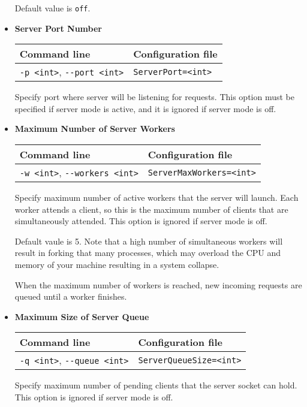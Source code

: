 \documentclass[a4paper]{book}
\begin{document}
\begin{itemize}
 Default value is \verb#off#.

\item {\bf Server Port Number}

\begin{tabular}{|l|l|}
Command line       & Configuration file   \\ \hline
\verb#-p <int>#, \verb#--port <int>#   & \verb#ServerPort=<int>#  \\ \hline
\end{tabular}

  Specify port where server will be listening for requests.  This
  option must be specified if server mode is active, and it is ignored
  if server mode is off.

\item {\bf Maximum Number of Server Workers}

\begin{tabular}{|l|l|}
Command line       & Configuration file   \\ \hline
\verb#-w <int>#, \verb#--workers <int>#   & \verb#ServerMaxWorkers=<int>#  \\ \hline
\end{tabular}

  Specify maximum number of active workers that the server will launch.
  Each worker attends a client, so this is the maximum number of
  clients that are simultaneously attended.
  This option is ignored if server mode is off.

  Default vaule is 5. Note that a high number of simultaneous workers will 
  result in forking that many processes, which may overload the CPU and
  memory of your machine resulting in a system collapse.

  When the maximum number of workers is reached, new incoming requests
  are queued until a worker finishes.

  

\item {\bf Maximum Size of Server Queue}

\begin{tabular}{|l|l|}
Command line       & Configuration file   \\ \hline
\verb#-q <int>#, \verb#--queue <int>#   & \verb#ServerQueueSize=<int>#  \\ \hline
\end{tabular}

  Specify maximum number of pending clients that the server socket can hold.
  This option is ignored if server mode is off.
  

\end{itemize}
\end{document}
